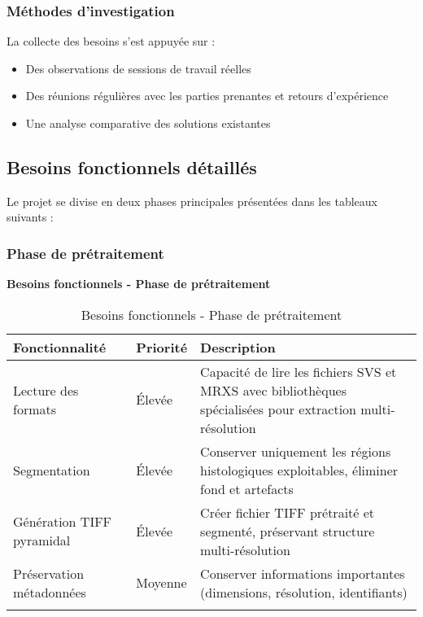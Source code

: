 \documentclass[12pt,a4paper]{report}
\begin{document}
\subsubsection{Méthodes d'investigation}

La collecte des besoins s'est appuyée sur :
\begin{itemize}
\item Des observations de sessions de travail réelles
\item Des réunions régulières avec les parties prenantes et retours d'expérience
\item Une analyse comparative des solutions existantes
\end{itemize}

\subsection{Besoins fonctionnels détaillés}

Le projet se divise en deux phases principales présentées dans les tableaux suivants :

\subsubsection{Phase de prétraitement}

\vspace{1em}
\begin{center}
\textbf{\large Besoins fonctionnels - Phase de prétraitement}
\end{center}
\vspace{0.5em}

\begin{longtable}{|p{3.5cm}|p{1.5cm}|p{9cm}|}
\hline
\rowcolor{TableHeaderColor}
\textbf{Fonctionnalité} & \textbf{Priorité} & \textbf{Description} \\
\hline
\endhead

Lecture des formats & Élevée & Capacité de lire les fichiers SVS et MRXS avec bibliothèques spécialisées pour extraction multi-résolution \\
\hline

Segmentation & Élevée & Conserver uniquement les régions histologiques exploitables, éliminer fond et artefacts \\
\hline

Génération TIFF pyramidal & Élevée & Créer fichier TIFF prétraité et segmenté, préservant structure multi-résolution \\
\hline

Préservation métadonnées & Moyenne & Conserver informations importantes (dimensions, résolution, identifiants) \\
\hline

\caption{Besoins fonctionnels - Phase de prétraitement}
\end{longtable}
\end{document}
